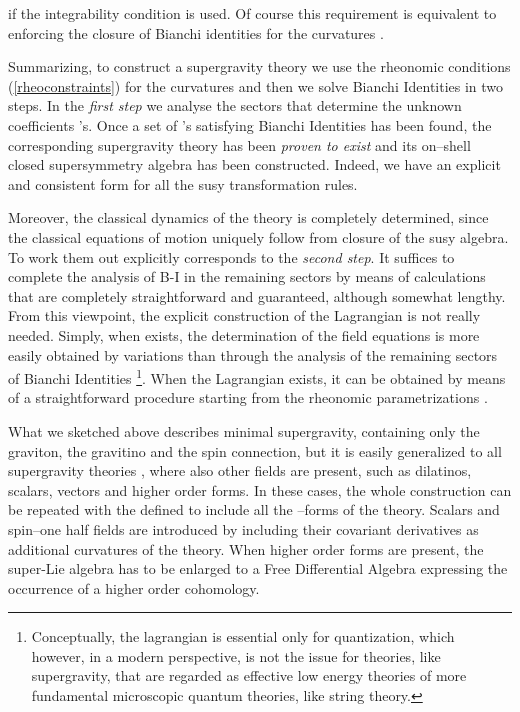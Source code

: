 \documentclass[a4paper,12pt]{article}
\begin{document}
if the integrability condition \coordHE{} is used. Of course this requirement is
equivalent to enforcing the
closure of  Bianchi identities for the curvatures \coordHE{}.
\par
Summarizing, to construct a supergravity theory we use the rheonomic conditions
(\ref{rheoconstraints}) for the curvatures and then we solve Bianchi
Identities in two steps.
In the {\em first step} we analyse the sectors that determine the unknown
coefficients \coordHE{}'s.
Once a set of \coordHE{}'s satisfying Bianchi Identities has
been found, the corresponding supergravity theory has been {\em proven to
  exist} and its on--shell closed supersymmetry algebra has been constructed.
Indeed, we have an explicit and consistent form for all the susy transformation rules.
\par
Moreover, the classical dynamics of the theory is completely
determined, since the classical equations of motion uniquely follow from closure of the susy
algebra.
To work them out explicitly corresponds to the {\em second step}.
It suffices to complete the analysis of B-I in the remaining sectors
by means of calculations that are completely straightforward and guaranteed, although somewhat lengthy.
From this viewpoint, the explicit construction of the Lagrangian \coordHE{} is not really needed.
Simply, when \coordHE{} exists, the determination of the field equations is more
easily obtained by \coordHE{} variations than through the analysis of
the remaining sectors of Bianchi Identities
\footnote{Conceptually, the lagrangian is essential only for quantization, which
however, in a modern perspective, is not the issue for theories, like
supergravity, that are regarded as effective low energy theories of more
fundamental microscopic quantum theories, like string theory.}.
When the Lagrangian exists, it can be obtained by means of a straightforward
procedure starting from the rheonomic parametrizations \cite{castdauriafre}.
\par
What we sketched above describes minimal supergravity, containing only the
graviton, the gravitino and the spin connection, but it is easily generalized to
all supergravity theories \cite{castdauriafre}, where also other fields are present, such as dilatinos,
scalars, vectors and higher order forms. In these cases, the whole
construction can be repeated with the \coordHE{} defined to include all the
\coordHE{}--forms of the theory. Scalars and spin--one half fields are introduced by
including their covariant derivatives as additional curvatures of the
theory. When higher order forms are present, the super-Lie algebra has to be
enlarged to a Free Differential Algebra expressing the occurrence of a
higher order cohomology.
\end{document}
